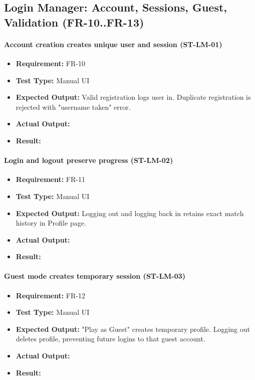 \documentclass[12pt, titlepage]{article}
\begin{document}
\subsection{Login Manager: Account, Sessions, Guest, Validation (FR-10..FR-13)}

\paragraph{Account creation creates unique user and session (ST-LM-01)}
\begin{itemize}
  \item \textbf{Requirement:} FR-10
  \item \textbf{Test Type:} Manual UI
  \item \textbf{Expected Output:} Valid registration logs user in. Duplicate registration is rejected with "username taken" error.
  \item \textbf{Actual Output:} 
  \item \textbf{Result:} 
\end{itemize}

\paragraph{Login and logout preserve progress (ST-LM-02)}
\begin{itemize}
  \item \textbf{Requirement:} FR-11
  \item \textbf{Test Type:} Manual UI
  \item \textbf{Expected Output:} Logging out and logging back in retains exact match history in Profile page.
  \item \textbf{Actual Output:} 
  \item \textbf{Result:} 
\end{itemize}

\paragraph{Guest mode creates temporary session (ST-LM-03)}
\begin{itemize}
  \item \textbf{Requirement:} FR-12
  \item \textbf{Test Type:} Manual UI
  \item \textbf{Expected Output:} "Play as Guest" creates temporary profile. Logging out deletes profile, preventing future logins to that guest account.
  \item \textbf{Actual Output:} 
  \item \textbf{Result:} 
\end{itemize}
\end{document}
